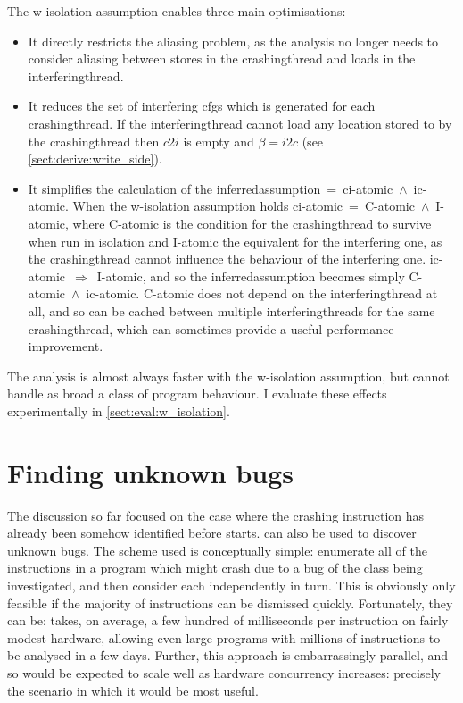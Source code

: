 The \gls{w-isolation} assumption enables three main optimisations:

\begin{itemize}
\item
  It directly restricts the aliasing problem, as the analysis no
  longer needs to consider aliasing between stores in the
  \gls{crashingthread} and loads in the \gls{interferingthread}.
\item
  It reduces the set of interfering \glspl{cfg} which is generated for
  each \gls{crashingthread}.  If the \gls{interferingthread} cannot
  load any location stored to by the \gls{crashingthread} then $c2i$
  is empty and $\beta = i2c$ (see \autoref{sect:derive:write_side}).
\item
  It simplifies the calculation of the
  \gls{inferredassumption}~=~\gls{ci-atomic}~$\wedge$~\gls{ic-atomic}.
  When the \gls{w-isolation} assumption holds
  \gls{ci-atomic}~=~C-atomic~$\wedge$~I-atomic, where C-atomic is the
  condition for the \gls{crashingthread} to survive when run in
  isolation and I-atomic the equivalent for the interfering one, as
  the \gls{crashingthread} cannot influence the behaviour of the
  interfering one.  \gls{ic-atomic}~$\Rightarrow$~I-atomic, and so the
  \gls{inferredassumption} becomes simply
  C-atomic~$\wedge$~\gls{ic-atomic}.  C-atomic does not depend on the
  \gls{interferingthread} at all, and so can be cached between
  multiple \glspl{interferingthread} for the same
  \gls{crashingthread}, which can sometimes provide a useful
  performance improvement.
\end{itemize}
The analysis is almost always faster with the \gls{w-isolation}
assumption, but cannot handle as broad a class of program behaviour.
I evaluate these effects experimentally in
\autoref{sect:eval:w_isolation}.

\section{Finding unknown bugs}
\label{sect:derive:unknown_bugs}


The discussion so far focused on the case where the crashing
instruction has already been somehow identified before {\technique}
starts.  {\Technique} can also be used to discover unknown bugs.  The
scheme used is conceptually simple: enumerate all of the instructions
in a program which might crash due to a bug of the class being
investigated, and then consider each independently in turn.  This is
obviously only feasible if the majority of instructions can be
dismissed quickly.  Fortunately, they can be: {\implementation} takes,
on average, a few hundred of milliseconds per instruction on fairly
modest hardware, allowing even large programs with millions of
instructions to be analysed in a few days.  Further, this approach is
embarrassingly parallel, and so would be expected to scale well as
hardware concurrency increases: precisely the scenario in which it
would be most useful.

